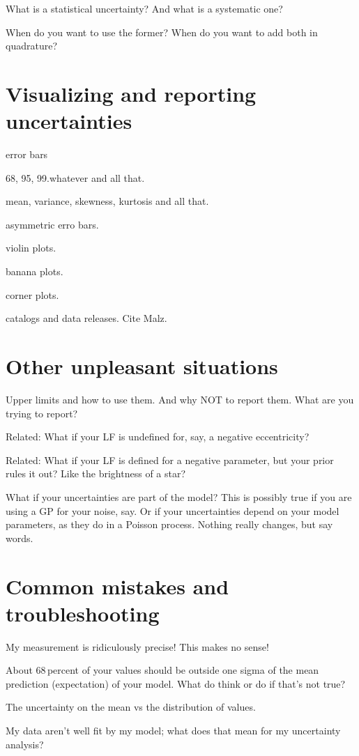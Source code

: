 \documentclass[10pt]{article}
\begin{document}
What is a statistical uncertainty? And what is a systematic one?

When do you want to use the former? When do you want to add both in quadrature?

\section{Visualizing and reporting uncertainties}\label{sec:viz}

error bars

68, 95, 99.whatever and all that.

mean, variance, skewness, kurtosis and all that.

asymmetric erro bars.

violin plots.

banana plots.

corner plots.

catalogs and data releases. Cite Malz.

\section{Other unpleasant situations}

Upper limits and how to use them. And why NOT to report them. What are
you trying to report?

Related: What if your LF is undefined for, say, a negative eccentricity?

Related: What if your LF is defined for a negative parameter, but your
prior rules it out? Like the brightness of a star?

What if your uncertainties are part of the model? This is possibly
true if you are using a GP for your noise, say. Or if your
uncertainties depend on your model parameters, as they do in a Poisson
process. Nothing really changes, but say words.

\section{Common mistakes and troubleshooting}

My measurement is ridiculously precise! This makes no sense!

About 68\,percent of your values should be outside one sigma of the
mean prediction (expectation) of your model. What do think or do if
that's not true?

The uncertainty on the mean vs the distribution of values.

My data aren't well fit by my model; what does that mean for my uncertainty
analysis?
\end{document}
